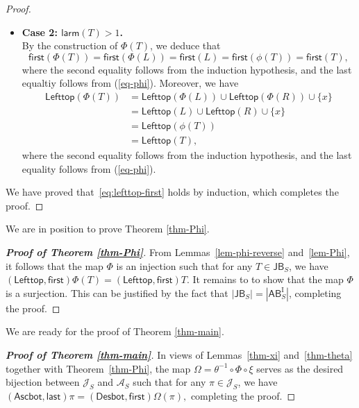 \documentclass[12pt]{article}
\numberwithin{equation}{section}
\theoremstyle{plain}
\def\larm{\mathsf{larm}}
\def\AB{\mathsf{AB}}
\def\Ascbot{\mathsf{Ascbot}}
\def\Desbot{\mathsf{Desbot}}
\def\JB{\mathsf{JB}}
\def\first{\mathsf{first}}
\def\last{\mathsf{last}}
\def\Lefttop{\mathsf{Lefttop}}
\begin{document}
\begin{proof}
\begin{itemize}
   				\item {\bf Case 2:   $\larm(T)>1$. }\\
   				By the construction of $\Phi(T)$, we deduce that
   				$$
   				\first(\Phi(T))=\first(\Phi(L))=\first(L)=\first(\phi(T)) =\first(T),
   				$$
   				where the second equality follows from the induction hypothesis, and the last equaltiy follows from (\ref{eq-phi}). 
   				Moreover, we have
   				\[
   				\begin{aligned}
   				\Lefttop(\Phi(T))&=\Lefttop(\Phi(L))\cup \Lefttop(\Phi(R))\cup \{x\}\\
   				&=\Lefttop(L)\cup \Lefttop(R)\cup \{x\}\\
   				&=\Lefttop(\phi(T)) \\
   				&=\Lefttop(T),
   				\end{aligned}
   				\]
   				where the second equality follows from the induction hypothesis, and the last equality  follows from (\ref{eq-phi}). 
				\end{itemize} 
				We have proved that~\eqref{eq:lefttop-first} holds by induction, which  completes the proof.
   			\end{proof}
   			
   			 
   			 
   			 
   			We are in position to prove Theorem \ref{thm-Phi}.
   			
   	
   			
   			  \begin{proof}[{\bf Proof of Theorem \ref{thm-Phi}}] From Lemmas~\ref{lem-phi-reverse} and~\ref{lem-Phi}, it follows that the map $\Phi$ is an injection  such that for any $T\in \JB_S$, we have 	$(\Lefttop, \first)\Phi(T)=(\Lefttop, \first)T$.  It remains to 
   			 to show that the map $\Phi$ is a surjection.   This can be justified by the fact that $|\JB_S|=|\AB^{\mathrm{I}}_S|$, completing the proof. 
			 \end{proof}
			 
			 We are ready for the proof of Theorem \ref{thm-main}. 
   			
   			\begin{proof}[{\bf Proof of Theorem \ref{thm-main}}]  In views of Lemmas~\ref{thm-xi} and~\ref{thm-theta} together with Theorem~\ref{thm-Phi}, the map $\Omega=\theta^{-1}\circ\Phi\circ\xi$ serves as the desired bijection between $\mathcal{J}_S$ and $\mathcal{A}_S$ such that 
   			for any $\pi\in \mathcal{J}_S$, we have $	(\Ascbot, \last)\pi= (\Desbot, \first)\Omega(\pi), $ completing the proof.
   \end{proof}			
   			
\end{document}
